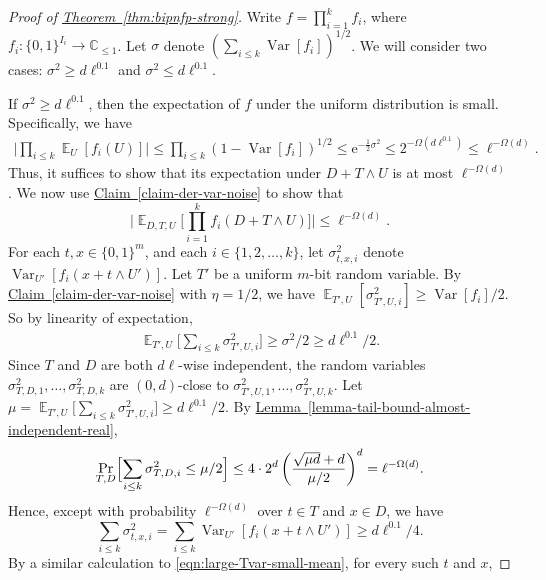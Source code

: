 \documentclass[11pt]{article}
\numberwithin{equation}{section}
\theoremstyle{definition}
\theoremstyle{plain}
\newcommand{\C}{\mathbb C}
\newcommand{\eee}{\mathrm e}
\newcommand{\expref}[2]{\hyperref[#2]{#1~\ref{#2}}}
\newcommand{\zo}{\{0,1\}}
\def\Blocklength{\ell}
\DeclareMathOperator*{\E}{\mathbb{E}}                 %
\DeclareMathOperator*{\Var}{Var}                 %
\begin{document}
  \begin{proof}[Proof of {\expref{Theorem}{thm:bipnfp-strong}}]
    Write $f = \prod_{i=1}^k f_i$, where $f_i\colon \zo^{I_i} \to \C_{\le 1}$.
    Let $\sigma$ denote $(\sum_{i \le k} \Var[f_i])^{1/2}$.
    We will consider two cases:  $\sigma^2 \ge d\Blocklength^{0.1}$ and $\sigma^2 \le d\Blocklength^{0.1}$.

    If $\sigma^2 \ge d\Blocklength^{0.1}$, then the expectation of $f$ under the uniform distribution is small.
		Specifically, we have
    \begin{align} \label{eqn:large-Tvar-small-mean}
      \Big| \prod_{i \le k} \E_{U}[f_i(U)] \Big|
      \le \prod_{i \le k} (1 - \Var[f_i])^{1/2} 
      \le \eee^{-\frac{1}{2} \sigma^2} 
      \le 2^{-\Omega(d\Blocklength^{0.1})}
      \le \Blocklength^{-\Omega(d)} .
		\end{align}
    Thus, it suffices to show that its expectation under $D + T \wedge U$ is at most $\Blocklength^{-\Omega(d)}$.
		We now use \expref{Claim}{claim-der-var-noise} to show that
    \[
      \Big| \E_{D,T,U} \Big[ \prod_{i=1}^k f_i(D + T \wedge U) \Big] \Big|
      \le \Blocklength^{-\Omega(d)} .
    \]
    For each $t, x \in \zo^m$, and each $i \in \{1, 2, \ldots, k\}$, let $\sigma_{t, x, i}^2$ denote $\Var_{U'} [f_i(x + t \wedge U')]$.
    Let $T'$ be a 
    uniform $m$-bit random variable.  
%
    By \expref{Claim}{claim-der-var-noise} with $\eta = 1/2$, we have $\E_{T',U}[ \sigma_{T',U,i}^2 ] \ge \Var[f_i] / 2$.
    So by linearity of expectation,
    \begin{align*}
      \E_{T',U} \Big[\sum_{i \le k} \sigma_{T',U,i}^2 \Big]
      \ge \sigma^2 / 2
      \ge d \Blocklength^{0.1} / 2 .
    \end{align*}
    Since $T$ and $D$ are both $d\Blocklength$-wise independent, the random variables
    $\sigma_{T,D,1}^2, \ldots, \sigma_{T,D,k}^2$ are $(0, d)$-close to $\sigma_{T',U,1}^2, \ldots, \sigma_{T',U,k}^2$.
    Let $\mu = \E_{T',U} \bigl[ \sum_{i \le k} \sigma_{T',U,i}^2 \bigr] \ge d \Blocklength^{0.1} / 2$.
    By \expref{Lemma}{lemma-tail-bound-almost-independent-real},
    \[
      \Pr_{T,D} \Bigl[ \sum_{i \le k} \sigma_{T,D,i}^2 \le \mu / 2 \Bigr]
      \le 4\cdot 2^d \left( \frac{\sqrt{\mu d} + d}{\mu / 2} \right)^d = \Blocklength^{-\Omega(d)} .
    \]
    Hence, except with probability $\Blocklength^{-\Omega(d)}$ over $t \in T$ and $x \in D$, we have
    \[
      \sum_{i \le k} \sigma_{t,x,i}^2
      = \sum_{i \le k} \Var_{U'}[f_i(x + t \wedge U')]
      \ge d\Blocklength^{0.1} / 4 .
    \]
    By a similar calculation to \eqref{eqn:large-Tvar-small-mean}, for every such $t$ and $x$,

\end{proof}
\end{document}
